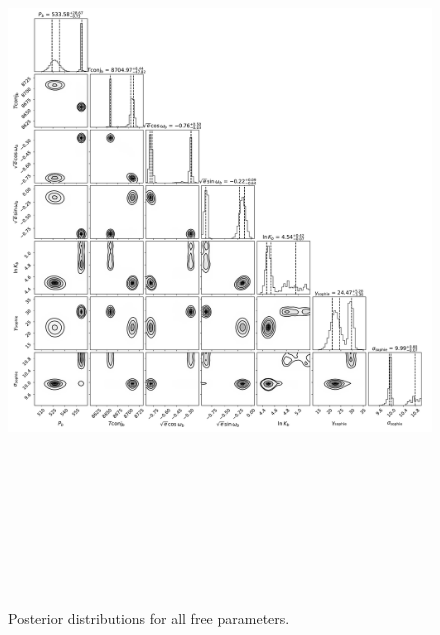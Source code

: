 \documentclass{emulateapj}
\begin{document}
 
\begin{figure}[!h]
\centering

\includegraphics[height=8.0in,width=6.0in,keepaspectratio]{hd224016_corner.pdf}
\caption{Posterior distributions for all free parameters.}
\end{figure} 

 

\end{document}
